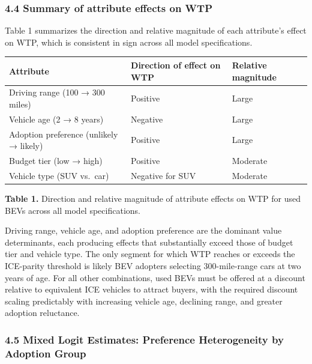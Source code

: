 \documentclass[
  letterpaper,
  DIV=11,
  numbers=noendperiod]{scrartcl}
\begin{document}
\subsubsection{4.4 Summary of attribute effects on
WTP}\label{summary-of-attribute-effects-on-wtp}

Table 1 summarizes the direction and relative magnitude of each
attribute's effect on WTP, which is consistent in sign across all model
specifications.

\begin{longtable}[]{@{}lll@{}}
\toprule\noalign{}
Attribute & Direction of effect on WTP & Relative magnitude \\
\midrule\noalign{}
\endhead
\bottomrule\noalign{}
\endlastfoot
Driving range (100 → 300 miles) & Positive & Large \\
Vehicle age (2 → 8 years) & Negative & Large \\
Adoption preference (unlikely → likely) & Positive & Large \\
Budget tier (low → high) & Positive & Moderate \\
Vehicle type (SUV vs.~car) & Negative for SUV & Moderate \\
\end{longtable}

\textbf{Table 1.} Direction and relative magnitude of attribute effects
on WTP for used BEVs across all model specifications.

Driving range, vehicle age, and adoption preference are the dominant
value determinants, each producing effects that substantially exceed
those of budget tier and vehicle type. The only segment for which WTP
reaches or exceeds the ICE-parity threshold is likely BEV adopters
selecting 300-mile-range cars at two years of age. For all other
combinations, used BEVs must be offered at a discount relative to
equivalent ICE vehicles to attract buyers, with the required discount
scaling predictably with increasing vehicle age, declining range, and
greater adoption reluctance.

\subsubsection{4.5 Mixed Logit Estimates: Preference Heterogeneity by
Adoption
Group}\label{mixed-logit-estimates-preference-heterogeneity-by-adoption-group}
\end{document}
